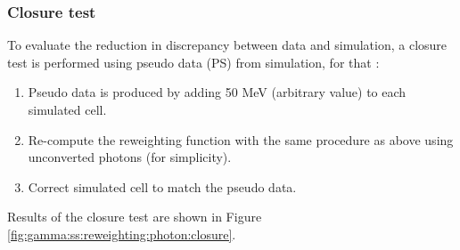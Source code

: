 \subsubsection{Closure test}
To evaluate the reduction in discrepancy between data and simulation, a closure test is performed using pseudo data (PS) from simulation, for that :
\begin{enumerate}
    \item Pseudo data is produced by adding 50 MeV (arbitrary value) to each simulated cell.
    \item Re-compute the reweighting function with the same procedure as above using unconverted photons (for simplicity).
    \item Correct simulated cell to match the pseudo data.
\end{enumerate}
Results of the closure test are shown in Figure \ref{fig:gamma:ss:reweighting:photon:closure}. 
